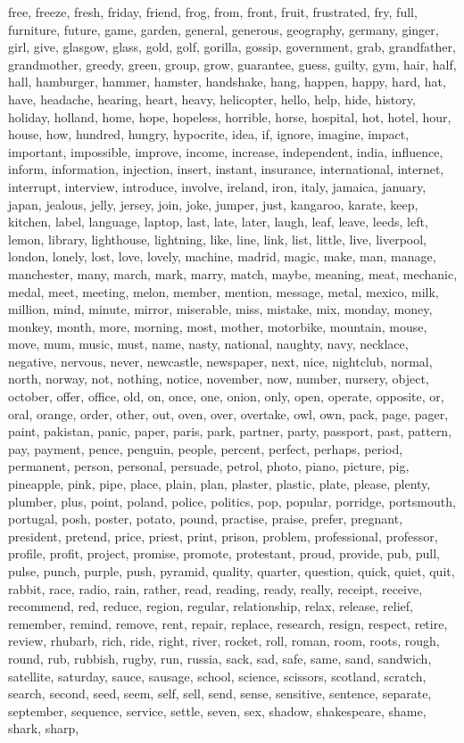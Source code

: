 free, freeze, fresh, friday, friend, frog, from, front, fruit, frustrated, fry, full, furniture, future, game, garden, general, generous, geography, germany, ginger, girl, give, glasgow, glass, gold, golf, gorilla, gossip, government, grab, grandfather, grandmother, greedy, green, group, grow, guarantee, guess, guilty, gym, hair, half, hall, hamburger, hammer, hamster, handshake, hang, happen, happy, hard, hat, have, headache, hearing, heart, heavy, helicopter, hello, help, hide, history, holiday, holland, home, hope, hopeless, horrible, horse, hospital, hot, hotel, hour, house, how, hundred, hungry, hypocrite, idea, if, ignore, imagine, impact, important, impossible, improve, income, increase, independent, india, influence, inform, information, injection, insert, instant, insurance, international, internet, interrupt, interview, introduce, involve, ireland, iron, italy, jamaica, january, japan, jealous, jelly, jersey, join, joke, jumper, just, kangaroo, karate, keep, kitchen, label, language, laptop, last, late, later, laugh, leaf, leave, leeds, left, lemon, library, lighthouse, lightning, like, line, link, list, little, live, liverpool, london, lonely, lost, love, lovely, machine, madrid, magic, make, man, manage, manchester, many, march, mark, marry, match, maybe, meaning, meat, mechanic, medal, meet, meeting, melon, member, mention, message, metal, mexico, milk, million, mind, minute, mirror, miserable, miss, mistake, mix, monday, money, monkey, month, more, morning, most, mother, motorbike, mountain, mouse, move, mum, music, must, name, nasty, national, naughty, navy, necklace, negative, nervous, never, newcastle, newspaper, next, nice, nightclub, normal, north, norway, not, nothing, notice, november, now, number, nursery, object, october, offer, office, old, on, once, one, onion, only, open, operate, opposite, or, oral, orange, order, other, out, oven, over, overtake, owl, own, pack, page, pager, paint, pakistan, panic, paper, paris, park, partner, party, passport, past, pattern, pay, payment, pence, penguin, people, percent, perfect, perhaps, period, permanent, person, personal, persuade, petrol, photo, piano, picture, pig, pineapple, pink, pipe, place, plain, plan, plaster, plastic, plate, please, plenty, plumber, plus, point, poland, police, politics, pop, popular, porridge, portsmouth, portugal, posh, poster, potato, pound, practise, praise, prefer, pregnant, president, pretend, price, priest, print, prison, problem, professional, professor, profile, profit, project, promise, promote, protestant, proud, provide, pub, pull, pulse, punch, purple, push, pyramid, quality, quarter, question, quick, quiet, quit, rabbit, race, radio, rain, rather, read, reading, ready, really, receipt, receive, recommend, red, reduce, region, regular, relationship, relax, release, relief, remember, remind, remove, rent, repair, replace, research, resign, respect, retire, review, rhubarb, rich, ride, right, river, rocket, roll, roman, room, roots, rough, round, rub, rubbish, rugby, run, russia, sack, sad, safe, same, sand, sandwich, satellite, saturday, sauce, sausage, school, science, scissors, scotland, scratch, search, second, seed, seem, self, sell, send, sense, sensitive, sentence, separate, september, sequence, service, settle, seven, sex, shadow, shakespeare, shame, shark, sharp, 